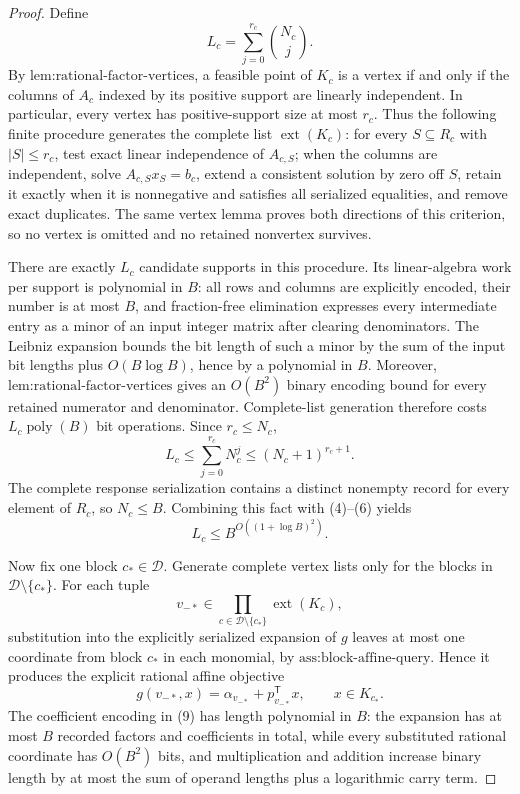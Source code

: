 \documentclass{article}
\begin{document}
\begin{proof}
Define
\[
 L_c=\sum_{j=0}^{r_c}\binom{N_c}{j}.
 \tag{5}
\]
By \(\text{lem:rational-factor-vertices}\), a feasible point of \(K_c\) is a vertex if and only if the columns of \(A_c\) indexed by its positive support are linearly independent.  In particular, every vertex has positive-support size at most \(r_c\).  Thus the following finite procedure generates the complete list \(\operatorname{ext}(K_c)\): for every \(S\subseteq R_c\) with \(|S|\le r_c\), test exact linear independence of \(A_{c,S}\); when the columns are independent, solve \(A_{c,S}x_S=b_c\), extend a consistent solution by zero off \(S\), retain it exactly when it is nonnegative and satisfies all serialized equalities, and remove exact duplicates.  The same vertex lemma proves both directions of this criterion, so no vertex is omitted and no retained nonvertex survives.

There are exactly \(L_c\) candidate supports in this procedure.  Its linear-algebra work per support is polynomial in \(B\): all rows and columns are explicitly encoded, their number is at most \(B\), and fraction-free elimination expresses every intermediate entry as a minor of an input integer matrix after clearing denominators.  The Leibniz expansion bounds the bit length of such a minor by the sum of the input bit lengths plus \(O(B\log B)\), hence by a polynomial in \(B\).  Moreover, \(\text{lem:rational-factor-vertices}\) gives an \(O(B^2)\) binary encoding bound for every retained numerator and denominator.  Complete-list generation therefore costs \(L_c\operatorname{poly}(B)\) bit operations.  Since \(r_c\le N_c\),
\[
 L_c
 \le \sum_{j=0}^{r_c}N_c^j
 \le (N_c+1)^{r_c+1}.
 \tag{6}
\]
The complete response serialization contains a distinct nonempty record for every element of \(R_c\), so \(N_c\le B\).  Combining this fact with (4)--(6) yields
\[
 L_c\le B^{O((1+\log B)^2)}.
 \tag{7}
\]

Now fix one block \(c_*\in\mathcal D\).  Generate complete vertex lists only for the blocks in \(\mathcal D\setminus\{c_*\}\).  For each tuple
\[
 v_{-*}\in
 \prod_{c\in\mathcal D\setminus\{c_*\}}
 \operatorname{ext}(K_c),
 \tag{8}
\]
substitution into the explicitly serialized expansion of \(g\) leaves at most one coordinate from block \(c_*\) in each monomial, by \(\text{ass:block-affine-query}\).  Hence it produces the explicit rational affine objective
\[
 g(v_{-*},x)=\alpha_{v_{-*}}+p_{v_{-*}}^{\mathsf T}x,
 \qquad x\in K_{c_*}.
 \tag{9}
\]
The coefficient encoding in (9) has length polynomial in \(B\): the expansion has at most \(B\) recorded factors and coefficients in total, while every substituted rational coordinate has \(O(B^2)\) bits, and multiplication and addition increase binary length by at most the sum of operand lengths plus a logarithmic carry term.


\end{proof}
\end{document}
